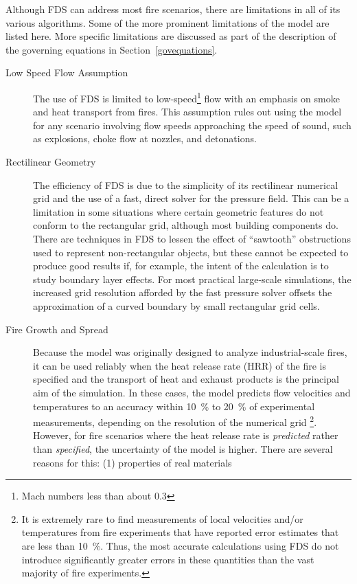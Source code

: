 \documentclass[11pt]{book}
\begin{document}
Although FDS can address most fire scenarios, there are limitations in all of its various
algorithms. Some of the more prominent limitations of the model are listed here. More
specific limitations are discussed as part of the description of the governing equations
in Section~\ref{govequations}.
\begin{description}
\item[Low Speed Flow Assumption] The use of FDS is limited to low-speed\footnote{Mach numbers less than about 0.3} flow
with an emphasis on smoke and heat transport from fires. This assumption rules out using the model for any scenario
involving flow speeds approaching the speed of sound, such as explosions, choke flow at nozzles, and detonations.
\item[Rectilinear Geometry] The efficiency of FDS is due to the simplicity of its rectilinear numerical grid and the
use of a fast, direct solver for the pressure field.
This can be a limitation in some situations where certain geometric features
do not conform to the rectangular grid, although most building components do. There are techniques in FDS to
lessen the effect of ``sawtooth'' obstructions used to represent non-rectangular objects, but these cannot be expected
to produce good results if, for example, the intent of the calculation is to study boundary layer effects. For most
practical large-scale simulations, the increased grid resolution afforded by the fast pressure solver offsets the
approximation of a curved boundary by small rectangular grid cells.
\item[Fire Growth and Spread]
Because the model was originally designed to analyze industrial-scale fires,
it can be used reliably when the heat release rate (HRR) of the fire is specified and the
transport of heat and exhaust products is the principal aim of the simulation.
In these cases, the model predicts flow velocities and temperatures to an accuracy within
10~\% to 20~\% of experimental measurements, depending on the resolution of the numerical grid
\footnote{It is extremely rare to
find measurements of local velocities and/or temperatures from fire experiments that
have reported error estimates that are less than 10~\%. Thus, the most accurate
calculations using FDS do not introduce significantly greater errors in these quantities
than the vast majority of fire experiments.}.
However, for fire scenarios where the heat release rate is {\em predicted} rather than {\em specified},
the uncertainty of the model is higher.
There are several reasons for this: (1) properties of real materials

\end{description}
\end{document}
